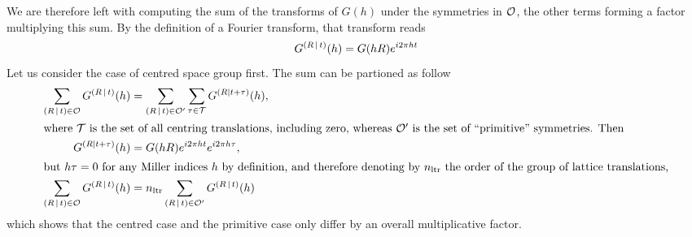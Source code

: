 \documentclass[pdf]{iucr}
\begin{document}
We are therefore left with computing the sum of the transforms of $G(h)$ under the symmetries in $\cal{O}$, the other terms forming a factor multiplying this sum. By the definition of a Fourier transform, that transform reads
\begin{equation}
G^{\left( R\,\vert\, t \right)}(h) = G(hR)e^{i 2\pi ht}
\label{eqn:transformofG}
\end{equation}
Let us consider the case of centred space group first. The sum can be partioned as follow
\begin{align}
 \sum_{\left( R\,\vert\, t \right) \in \cal{O}} G^{\left( R\,\vert\, t \right)}(h) &=  \sum_{\left( R\,\vert\, t \right) \in \cal{O'}} \sum_{\tau \in \cal{T}} G^{(R \mid t+\tau)}(h), \nonumber\\
\intertext{where $\cal{T}$ is the set of all centring translations, including zero, whereas $\cal{O'}$ is the set of ``primitive'' symmetries. Then}
G^{(R \mid t + \tau)}(h) &= G(hR) e^{i2\pi ht} e^{i2\pi h\tau}, \nonumber \\
\intertext{but $h\tau=0$ for any Miller indices $h$ by definition, and therefore denoting by $n_{\text{ltr}}$ the order of the group of lattice translations,}
\sum_{\left( R\,\vert\, t \right) \in \cal{O}} G^{\left( R\,\vert\, t \right)}(h) &= n_{\text{ltr}} \sum_{\left( R\,\vert\, t \right) \in \cal{O'}} G^{\left( R\,\vert\, t \right)}(h)
\end{align}
which shows that the centred case and the primitive case only differ by an overall multiplicative factor.
\end{document}
